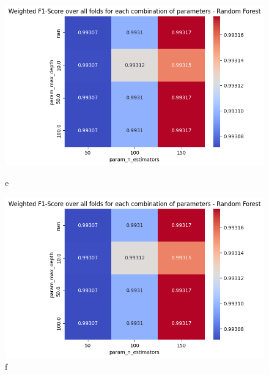 \begin{figure}[H]
            \vspace{0.5cm}  %

            \begin{minipage}{\textwidth}
                \begin{minipage}[t]{0.48\textwidth}
                    \centering
                    \includegraphics[width=\textwidth]{../figures/plots/section2/weighted_f1_score_for_each_combination_of_parameters_random_forest.png}
                    \caption{e}
                    \label{fig:e}
                \end{minipage}%
                \hfill%
                \begin{minipage}[t]{0.48\textwidth}
                    \centering
                    \includegraphics[width=\textwidth]{../figures/plots/section2/weighted_f1_score_for_each_combination_of_parameters_random_forest.png}
                    \caption{f}
                    \label{fig:f}
                \end{minipage}  
            
            \end{minipage}
            
        \end{figure}
            
